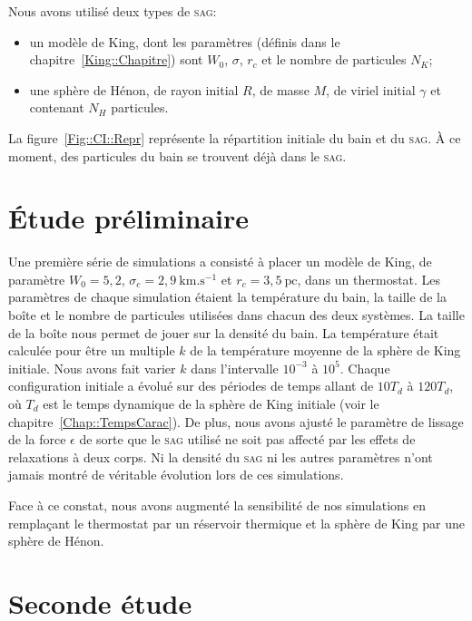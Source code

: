 	Nous avons utilisé deux types de \textsc{sag}:
	\begin{itemize}
		\item un modèle de King, dont les paramètres (définis dans le chapitre~\ref{King::Chapitre}) sont $W_0$, $\sigma$, $r_c$ et le nombre
			de particules $N_K$;
		\item une sphère de Hénon, de rayon initial $R$, de masse $M$, de viriel initial $\gamma$ et contenant $N_H$ particules.
	\end{itemize}

	La figure~\ref{Fig::CI::Repr} représente la répartition initiale du bain et du \textsc{sag}. À ce moment, des particules du bain se trouvent déjà dans le \textsc{sag}.

\section{Étude préliminaire}

	Une première série de simulations a consisté à placer un modèle de King, de paramètre $W_0 = 5,2$, $\sigma_c = 2,9\
	\mathrm{km}.\mathrm{s}^{-1}$ et $r_c = 3,5\ \mathrm{pc}$, dans un thermostat. Les paramètres de chaque simulation étaient la température du
	bain, la taille de la boîte et le nombre de particules utilisées dans chacun des deux systèmes. La taille de la boîte nous permet de jouer sur
	la densité du bain. La température était calculée pour être un multiple $k$ de la température moyenne de la sphère de King initiale. Nous
	avons fait varier $k$ dans l'intervalle $10^{-3}$ à $10^5$. Chaque configuration initiale a évolué sur des périodes de temps allant de $10T_d$
	à $120T_d$, où $T_d$ est le temps dynamique de la sphère de King initiale (voir le chapitre~\ref{Chap::TempsCarac}). De plus, nous avons
	ajusté le paramètre de lissage de la force $\epsilon$ de sorte que le \textsc{sag} utilisé ne soit pas affecté par les effets de relaxations à deux
	corps. Ni la densité du \textsc{sag} ni les autres paramètres n'ont jamais montré de véritable évolution lors de ces simulations.


	Face à ce constat, nous avons augmenté la sensibilité de nos simulations en remplaçant le thermostat par un réservoir thermique et la
	sphère de King par une sphère de Hénon.

\section{Seconde étude}\label{Sec::2ndStudy}

